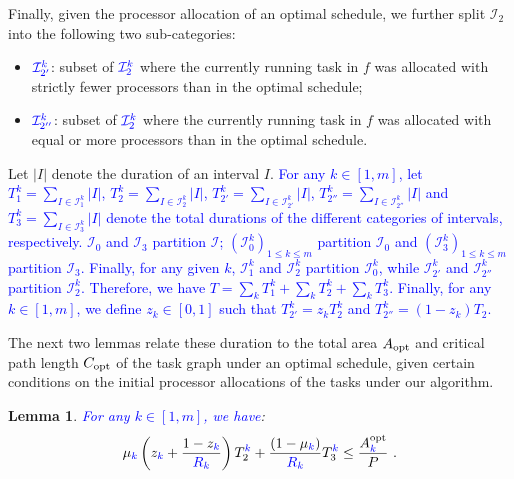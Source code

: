 \documentclass{article}
\newtheorem{lemma}{Lemma}
\newcommand\ratio{R\xspace}
\newcommand\opt{\textnormal{opt}\xspace}
\newcommand{\new}[1]{\textcolor{blue}{#1}}
\begin{document}
Finally, given the processor allocation of an optimal schedule, we further split $\mathcal{I}_2$ into the following two sub-categories:
\begin{itemize}
\item $\new{\mathcal{I}_{2'}^k}$: subset of $\new{\mathcal{I}_2^k}$ where the currently running task in $f$ was allocated with strictly fewer processors than in the optimal schedule;
\item $\new{\mathcal{I}_{2''}^k}$: subset of $\new{\mathcal{I}_2^k}$ where the currently running task in $f$ was allocated with equal or more processors than in the optimal schedule.
\end{itemize}


Let $|I|$ denote the duration of an interval $I$. \new{For any $k \in [1,m]$, let $T_1^k=\sum_{I\in \mathcal{I}_1^k} |I|$, $T_2^k = \sum_{I\in \mathcal{I}_2^k} |I|$, $T_{2'}^k=  \sum_{I\in \mathcal{I}_{2'}^k} |I|$, $T_{2''}^k =  \sum_{I\in \mathcal{I}_{2''}^k} |I|$ and $T_3^k =  \sum_{I\in \mathcal{I}_3^k} |I|$  denote the total durations of the different categories of intervals, respectively. $\mathcal{I}_0$ and $\mathcal{I}_3$ partition $\mathcal{I}$; $(\mathcal{I}_0^k)_{1 \leq k \leq m}$ partition $\mathcal{I}_0$ and $(\mathcal{I}_3^k)_{1 \leq k \leq m}$ partition $\mathcal{I}_3$. Finally, for any given $k$, $\mathcal{I}_1^k$ and $\mathcal{I}_2^k$ partition $\mathcal{I}_0^k$, while  $\mathcal{I}_{2'}^k$ and $\mathcal{I}_{2''}^k$ partition $\mathcal{I}_2^k$. Therefore, we have $T = \sum_k T_1^k + \sum_k T_2^k + \sum_k T_3^k$. Finally, for any $k \in [1,m]$, we define $z_k \in [0,1]$ such that $T_{2'}^k=z_k T_2^k$ and $T_{2''}^k=(1-z_k) T_2$.}


The next two lemmas relate these duration to the total area $A_{\opt}$ and critical path length $C_{\opt}$ of the task graph under an optimal schedule, given certain conditions on the initial processor allocations of the tasks under our algorithm.
\begin{lemma}\label{lem.area}
\new{For any $k \in [1,m]$, we have}:
\begin{equation}\label{Area}
\mu_{\new{k}} \left( z_{\new{k}}+\frac{1-z_{\new{k}}}{\new{\ratio_k}} \right)T_2^{\new{k}} + \frac{(1-\mu_{\new{k}})}{\new{\ratio_k}} T_3^{\new{k}} \le \frac{A^{\opt}_{\new{k}}}{P} \ .
\end{equation}
\end{lemma}
\end{document}

